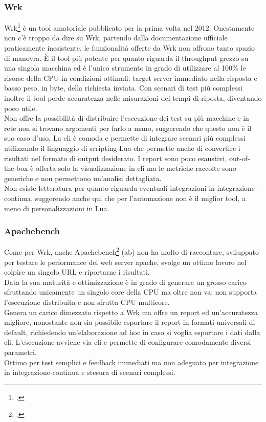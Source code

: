 \subsubsection{Wrk}
Wrk\footcite{site:wrk} è un tool amatoriale pubblicato per la prima volta nel 2012.
Onestamente non c'è troppo da dire su Wrk, partendo dalla documentazione ufficiale praticamente inesistente, le funzionalità offerte da Wrk non offrono tanto spazio di manovra.
È il tool più potente per quanto riguarda il throughput grezzo su una singola macchina ed è l'unico strumento in grado di utilizzare al 100\% le risorse della CPU in condizioni ottimali: target server immediato nella risposta e basso peso, in byte, della richiesta inviata. Con scenari di test più complessi inoltre il tool perde accuratezza nelle misurazioni dei tempi di riposta, diventando poco utile. \\
Non offre la possibilità di distribuire l'esecuzione dei test su più macchine e in rete non si trovano argomenti per farlo a mano, suggerendo che questo non è il suo caso d'uso.
La \gls{cli} è comoda e permette di integrare scenari più complessi utilizzando il linguaggio di scripting Lua che permette anche di convertire i risultati nel formato di output desiderato.
I report sono poco esaustivi, \gls{out-of-the-box} è offerta solo la visualizzazione in \gls{cli} ma le metriche raccolte sono generiche e non permettono un'analisi dettagliata.\\
Non esiste letteratura per quanto riguarda eventuali integrazioni in \gls{integrazione-continua}, suggerendo anche qui che per l'automazione non è il miglior tool, a meno di personalizzazioni in Lua.
\subsubsection{Apachebench}
Come per Wrk, anche Apachebench\footcite{site:ab} (ab) non ha molto di raccontare, sviluppato per testare le performance del web server apache, svolge un ottimo lavoro nel colpire un singolo URL e riportarne i risultati.\\
Data la sua maturità e ottimizzazione è in grado di generare un grosso carico sfruttando unicamente un singolo core della CPU ma oltre non va: non supporta l'esecuzione distribuita e non sfrutta CPU multicore. \\
Genera un carico dimezzato rispetto a Wrk ma offre un report ed un'accuratezza migliore, nonostante non sia possibile esportare il report in formati universali di default, richiedendo un'elaborazione ad hoc in caso si voglia esportare i dati dalla \gls{cli}.
L'esecuzione avviene via \gls{cli} e permette di configurare comodamente diversi parametri.\\
Ottimo per test semplici e feedback immediati ma non adeguato per integrazione in \gls{integrazione-continua} e stesura di scenari complessi.
